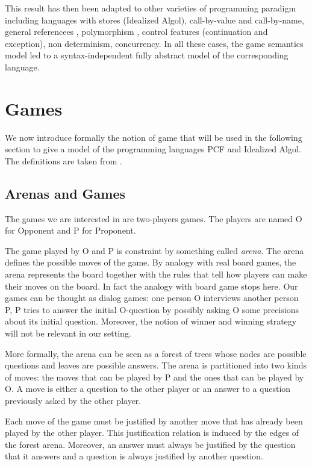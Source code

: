 This result has then been adapted to other varieties of programming
paradigm including languages with stores (Idealized Algol),
call-by-value \citep{honda99gametheoretic, abramsky98callbyvalue}
and call-by-name, general referencees
\citep{DBLP:conf/lics/AbramskyHM98}, polymorphism
\citep{DBLP:journals/apal/AbramskyJ05}, control features
(continuation and exception), non determinism, concurrency. In all
these cases, the game semantics model led to a syntax-independent
fully abstract model of the corresponding language.

\section{Games}
\label{sec:catgames}

We now introduce formally the notion of game that will be used in
the following section to give a model of the programming languages
PCF and Idealized Algol. The definitions are taken from
\cite{abramsky:game-semantics, hylandong_pcf, abramsky94full}.


\subsection{Arenas and Games}

The games we are interested in are two-players games. The players are named O for Opponent and P for Proponent.

The game played by O and P is constraint by something called
\emph{arena}. The arena defines the possible moves of the game. By
analogy with real board games, the arena represents the board
together with the rules that tell how players can make their moves
on the board. In fact the analogy with board game stops here. Our
games can be thought as dialog games: one person O interviews
another person P, P tries to answer the initial O-question by
possibly asking O some precisions about its initial question.
Moreover, the notion of winner and winning strategy will not be
relevant in our setting.


More formally, the arena can be seen as a forest of trees whose nodes are possible questions and leaves are possible answers.
The arena is partitioned into two kinds of moves: the moves that can be played by P and the ones that can be played by O.
A move is either a question to the other player or an answer to a question previously asked by the other player.

Each move of the game must be justified by another move that has already been played by the other player. This justification relation
is induced by the edges of the forest arena. Moreover, an answer must always be justified by the question that it answers and a question
is always justified by another question.

